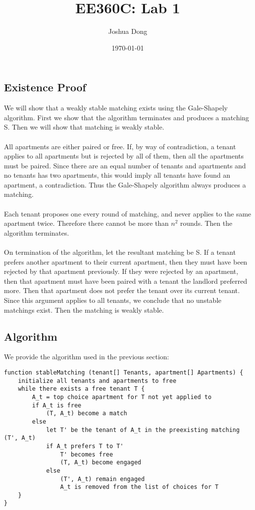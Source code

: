 \documentclass{article}
\begin{document}
\title{EE360C: Lab 1}
\author{Joshua Dong}
\date{\today}
\maketitle

\subsection{Existence Proof}
We will show that a weakly stable matching exists using the Gale-Shapely
algorithm. First we show that the algorithm terminates and produces a
matching S. Then we will show that matching is weakly stable.
\\\\
All apartments are either paired or free. If, by way of contradiction, a
tenant applies to all apartments but is rejected by all of them, then all the
apartments must be paired. Since there are an equal number of tenants and
apartments and no tenants has two apartments, this would imply all tenants
have found an apartment, a contradiction. Thus the Gale-Shapely algorithm
always produces a matching.
\\\\
Each tenant proposes one every round of matching, and never applies to the
same apartment twice. Therefore there cannot be more than $n^2$ rounds. Then
the algorithm terminates.
\\\\
On termination of the algorithm, let the resultant matching be S. If a tenant
prefers another apartment to their current apartment, then they must have been
rejected by that apartment previously. If they were rejected by an apartment,
then that apartment must have been paired with a tenant the landlord preferred
more. Then that apartment does not prefer the tenant over its current tenant.
Since this argument applies to all tenants, we conclude that no unstable
matchings exist. Then the matching is weakly stable.

\newpage

\subsection{Algorithm}
We provide the algorithm used in the previous section:

\begin{lstlisting}
function stableMatching (tenant[] Tenants, apartment[] Apartments) {
    initialize all tenants and apartments to free
    while there exists a free tenant T {
        A_t = top choice apartment for T not yet applied to
        if A_t is free
            (T, A_t) become a match
        else
            let T' be the tenant of A_t in the preexisting matching (T', A_t)
            if A_t prefers T to T'
                T' becomes free
                (T, A_t) become engaged 
            else
                (T', A_t) remain engaged
                A_t is removed from the list of choices for T
    }
}
\end{lstlisting}
\end{document}
